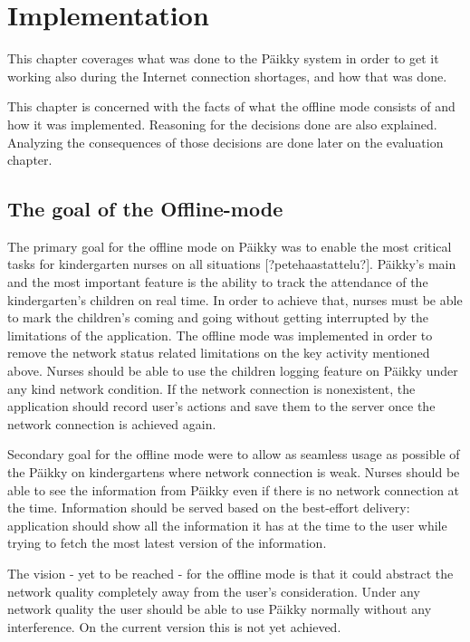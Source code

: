 
\chapter{Implementation}
This chapter coverages what was done to the Päikky system in order to get it working also during the Internet connection shortages, and how that was done. 

This chapter is concerned with the facts of what the offline mode consists of and how it was implemented. Reasoning for the decisions done are also explained. Analyzing the consequences of those decisions are done later on the evaluation chapter.

\section{The goal of the Offline-mode}
The primary goal for the offline mode on Päikky was to enable the most critical tasks for kindergarten nurses on all situations [?petehaastattelu?]. Päikky's main and the most important feature is the ability to track the attendance of the kindergarten's children on real time. In order to achieve that, nurses must be able to mark the children's coming and going without getting interrupted by the limitations of the application. The offline mode was implemented in order to remove the network status related limitations on the key activity mentioned above. Nurses should be able to use the children logging feature on Päikky under any kind network condition. If the network connection is nonexistent, the application should record user's actions and save them to the server once the network connection is achieved again.

Secondary goal for the offline mode were to allow as seamless usage as possible of the Päikky on kindergartens where network connection is weak. Nurses should be able to see the information from Päikky even if there is no network connection at the time. Information should be served based on the best-effort delivery: application should show all the information it has at the time to the user while trying to fetch the most latest version of the information.

The vision - yet to be reached - for the offline mode is that it could abstract the network quality completely away from the user's consideration. Under any network quality the user should be able to use Päikky normally without any interference. On the current version this is not yet achieved. 



